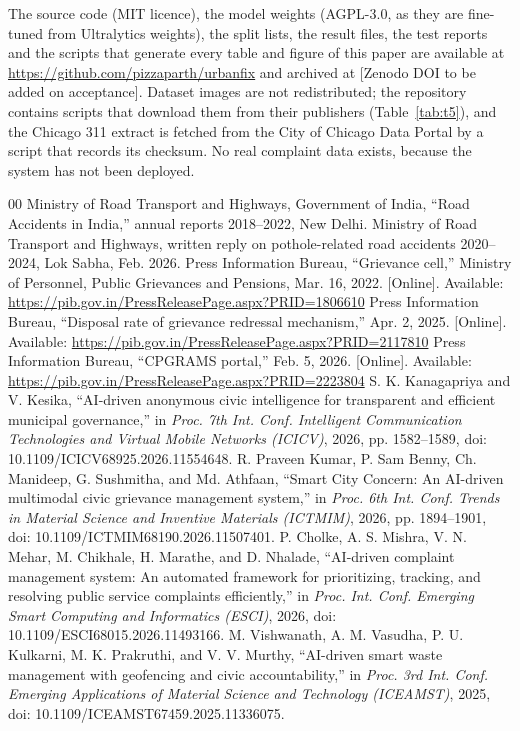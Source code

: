 \documentclass{ieeeaccess}
\newcommand{\repoURL}{\url{https://github.com/pizzaparth/urbanfix}}
\newcommand{\archiveDOI}{[Zenodo DOI to be added on acceptance]}
\begin{document}
The source code (MIT licence), the model weights (AGPL-3.0, as they are fine-tuned from Ultralytics weights), the split lists, the result files, the test reports and the scripts that generate every table and figure of this paper are available at \repoURL{} and archived at \archiveDOI. Dataset images are not redistributed; the repository contains scripts that download them from their publishers (Table~\ref{tab:t5}), and the Chicago 311 extract is fetched from the City of Chicago Data Portal by a script that records its checksum. No real complaint data exists, because the system has not been deployed.

\clearpage
\begin{thebibliography}{00}
 Ministry of Road Transport and Highways, Government of India, ``Road Accidents in India,'' annual reports 2018--2022, New Delhi.
 Ministry of Road Transport and Highways, written reply on pothole-related road accidents 2020--2024, Lok Sabha, Feb. 2026.
 Press Information Bureau, ``Grievance cell,'' Ministry of Personnel, Public Grievances and Pensions, Mar. 16, 2022. [Online]. Available: \url{https://pib.gov.in/PressReleasePage.aspx?PRID=1806610}
 Press Information Bureau, ``Disposal rate of grievance redressal mechanism,'' Apr. 2, 2025. [Online]. Available: \url{https://pib.gov.in/PressReleasePage.aspx?PRID=2117810}
 Press Information Bureau, ``CPGRAMS portal,'' Feb. 5, 2026. [Online]. Available: \url{https://pib.gov.in/PressReleasePage.aspx?PRID=2223804}
 S. K. Kanagapriya and V. Kesika, ``AI-driven anonymous civic intelligence for transparent and efficient municipal governance,'' in \textit{Proc. 7th Int. Conf. Intelligent Communication Technologies and Virtual Mobile Networks (ICICV)}, 2026, pp. 1582--1589, doi: 10.1109/ICICV68925.2026.11554648.
 R. Praveen Kumar, P. Sam Benny, Ch. Manideep, G. Sushmitha, and Md. Athfaan, ``Smart City Concern: An AI-driven multimodal civic grievance management system,'' in \textit{Proc. 6th Int. Conf. Trends in Material Science and Inventive Materials (ICTMIM)}, 2026, pp. 1894--1901, doi: 10.1109/ICTMIM68190.2026.11507401.
 P. Cholke, A. S. Mishra, V. N. Mehar, M. Chikhale, H. Marathe, and D. Nhalade, ``AI-driven complaint management system: An automated framework for prioritizing, tracking, and resolving public service complaints efficiently,'' in \textit{Proc. Int. Conf. Emerging Smart Computing and Informatics (ESCI)}, 2026, doi: 10.1109/ESCI68015.2026.11493166.
 M. Vishwanath, A. M. Vasudha, P. U. Kulkarni, M. K. Prakruthi, and V. V. Murthy, ``AI-driven smart waste management with geofencing and civic accountability,'' in \textit{Proc. 3rd Int. Conf. Emerging Applications of Material Science and Technology (ICEAMST)}, 2025, doi: 10.1109/ICEAMST67459.2025.11336075.

\end{thebibliography}
\end{document}
